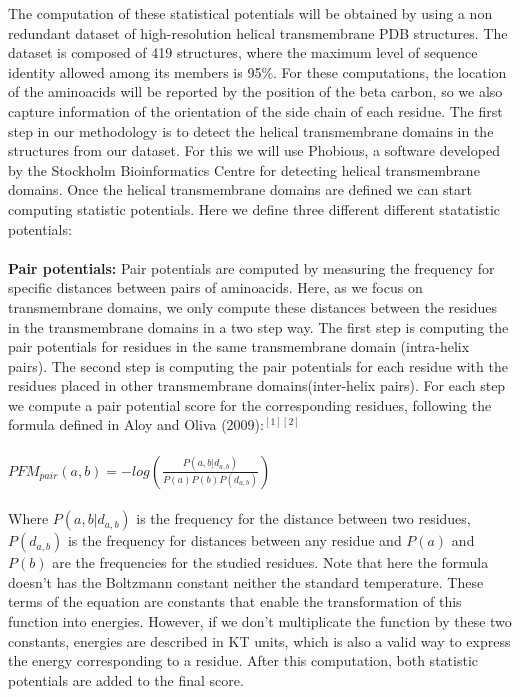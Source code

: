 \documentclass[12pt,titlepage]{article}
\theoremstyle{supercalifragilisticexpialidocious}
\begin{document}
The computation of these statistical potentials will be obtained by using a non redundant dataset of high-resolution helical transmembrane PDB structures. The dataset is composed of 419 structures, where the maximum level of sequence identity allowed among its members is 95\%. For these computations, the location of the aminoacids will be reported by the position of the beta carbon, so we also capture information of the orientation of the side chain of each residue. The first step in our methodology is to detect the helical transmembrane domains in the structures from our dataset. For this we will use Phobious, a software developed by the Stockholm Bioinformatics Centre for detecting helical transmembrane domains. Once the helical transmembrane domains are defined we can start computing statistic potentials. Here we define three different different statatistic potentials:
\\ \\
\textbf{Pair potentials:} Pair potentials are computed by measuring the frequency for specific distances between pairs of aminoacids. Here, as we focus on transmembrane domains, we only compute these distances between the residues in the transmembrane domains in a two step way. The first step is computing the pair potentials for residues in the same transmembrane domain (intra-helix pairs). The second step is computing the pair potentials for each residue with the residues placed in other transmembrane domains(inter-helix pairs). For each step we compute a pair potential score for the corresponding residues, following the formula defined in Aloy and Oliva (2009):$^{[1][2]}$
\\ \\
$PFM_{pair}(a, b) = -log(\frac{P(a,b|d_{a,b})}{P(a)P(b)P(d_{a,b})})
$
\\ \\
Where $P(a,b|d_{a,b})$ is the frequency for the distance between two residues, $P(d_{a,b})$ is the frequency for distances between any residue and $P(a)$ and $P(b)$ are the frequencies for the studied residues. Note that here the formula doesn't has the Boltzmann constant neither the standard temperature. These terms of the equation are constants that enable the transformation of this function into energies. However, if we don't multiplicate the function by these two constants, energies are described in KT units, which is also a valid way to express the energy corresponding to a residue. After this computation, both statistic potentials are added to the final score.
\\ \\
\end{document}
